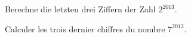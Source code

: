 Berechne die letzten drei Ziffern der Zahl $2^{2013}$.

\bigskip

Calculer les trois dernier chiffres du nombre $7^{2013}$.

